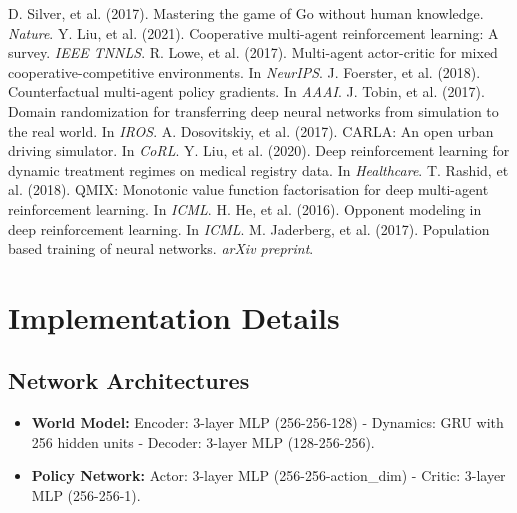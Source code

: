 \documentclass[11pt,a4paper]{article}
\begin{document}

\begin{thebibliography}{99}
 D. Silver, et al. (2017). Mastering the game of Go without human knowledge. \textit{Nature}.
 Y. Liu, et al. (2021). Cooperative multi-agent reinforcement learning: A survey. \textit{IEEE TNNLS}.
 R. Lowe, et al. (2017). Multi-agent actor-critic for mixed cooperative-competitive environments. In \textit{NeurIPS}.
 J. Foerster, et al. (2018). Counterfactual multi-agent policy gradients. In \textit{AAAI}.
 J. Tobin, et al. (2017). Domain randomization for transferring deep neural networks from simulation to the real world. In \textit{IROS}.
 A. Dosovitskiy, et al. (2017). CARLA: An open urban driving simulator. In \textit{CoRL}.
 Y. Liu, et al. (2020). Deep reinforcement learning for dynamic treatment regimes on medical registry data. In \textit{Healthcare}.
 T. Rashid, et al. (2018). QMIX: Monotonic value function factorisation for deep multi-agent reinforcement learning. In \textit{ICML}.
 H. He, et al. (2016). Opponent modeling in deep reinforcement learning. In \textit{ICML}.
 M. Jaderberg, et al. (2017). Population based training of neural networks. \textit{arXiv preprint}.
\end{thebibliography}

\appendix
\section{Implementation Details}
\subsection{Network Architectures}
\begin{itemize}
    \item \textbf{World Model:} Encoder: 3-layer MLP (256-256-128) - Dynamics: GRU with 256 hidden units - Decoder: 3-layer MLP (128-256-256).
    \item \textbf{Policy Network:} Actor: 3-layer MLP (256-256-action\_dim) - Critic: 3-layer MLP (256-256-1).
\end{itemize}
\end{document}
